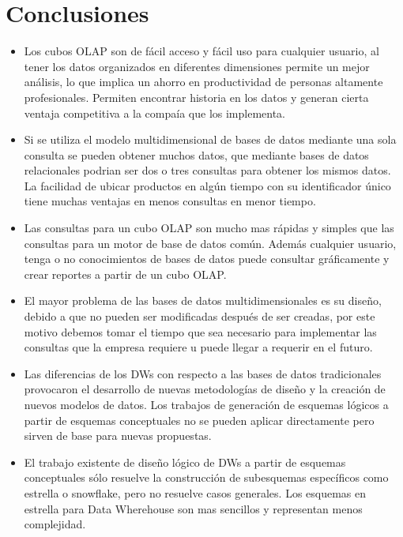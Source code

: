 \documentclass[DIV=calc, paper=a4, fontsize=11pt, twocolumn]{scrartcl}	 %
\begin{document}
\section*{Conclusiones}

\begin{itemize}
\item Los cubos OLAP son de f\'{a}cil acceso y f\'{a}cil uso para cualquier usuario, al tener los datos organizados en diferentes dimensiones permite un mejor análisis, lo que implica un ahorro en productividad de personas altamente profesionales. Permiten encontrar historia en los datos y generan cierta ventaja competitiva a la compa\'{i}a que los implementa.
\item Si se utiliza el modelo multidimensional de bases de datos mediante una sola consulta se pueden obtener muchos datos, que mediante bases de datos relacionales podrian ser dos o tres consultas para obtener los mismos datos. La facilidad de ubicar productos en alg\'{u}n tiempo con su identificador \'{u}nico tiene muchas ventajas en menos consultas en menor tiempo.
\item Las consultas para un cubo OLAP son mucho mas r\'{a}pidas y simples que las consultas para un motor de base de datos com\'{u}n. Adem\'{a}s cualquier usuario, tenga o no conocimientos de bases de datos puede consultar gr\'{a}ficamente y crear reportes a partir de un cubo OLAP.
\item El mayor problema de las bases de datos multidimensionales es su dise\~{n}o, debido a que no pueden ser modificadas despu\'{e}s de ser creadas, por este motivo debemos tomar el tiempo que sea necesario para implementar las consultas que la empresa requiere u puede llegar a requerir en el futuro.
\item Las diferencias de los DWs con respecto a las bases de datos tradicionales provocaron el desarrollo de
nuevas metodolog\'{i}as de dise\~{n}o y la creaci\'{o}n de nuevos modelos de datos. Los trabajos de generaci\'{o}n de
esquemas l\'{o}gicos a partir de esquemas conceptuales no se pueden aplicar directamente pero sirven de
base para nuevas propuestas.
\item El trabajo existente de dise\~{n}o l\'{o}gico de DWs a partir de esquemas conceptuales s\'{o}lo resuelve la
construcci\'{o}n de subesquemas espec\'{i}ficos como estrella o snowflake, pero no resuelve casos generales. Los esquemas en estrella para Data Wherehouse son mas sencillos y representan menos complejidad.
\end{itemize}
\end{document}
